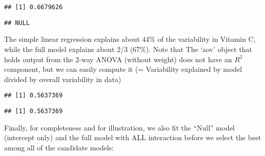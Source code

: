 \documentclass[
]{article}
\newenvironment{Shaded}{\begin{snugshade}}{\end{snugshade}}
\newcommand{\AttributeTok}[1]{\textcolor[rgb]{0.77,0.63,0.00}{#1}}
\newcommand{\CommentTok}[1]{\textcolor[rgb]{0.56,0.35,0.01}{\textit{#1}}}
\newcommand{\FunctionTok}[1]{\textcolor[rgb]{0.00,0.00,0.00}{#1}}
\newcommand{\NormalTok}[1]{#1}
\newcommand{\OtherTok}[1]{\textcolor[rgb]{0.56,0.35,0.01}{#1}}
\newcommand{\SpecialCharTok}[1]{\textcolor[rgb]{0.00,0.00,0.00}{#1}}
\begin{document}
\begin{verbatim}
## [1] 0.6679626
\end{verbatim}

\begin{Shaded}
\end{Shaded}

\begin{verbatim}
## NULL
\end{verbatim}

The simple linear regression explains about 44\% of the variability in
Vitamin C, while the full model explains about 2/3 (67\%). Note that The
`aov' object that holds output from the 2-way ANOVA (without weight)
does not have an \(R^{2}\) component, but we can easily compute it (=
Variability explained by model divided by overall variability in data)

\begin{Shaded}
\end{Shaded}

\begin{verbatim}
## [1] 0.5637369
\end{verbatim}

\begin{Shaded}
\end{Shaded}

\begin{verbatim}
## [1] 0.5637369
\end{verbatim}

Finally, for completeness and for illustration, we also fit the ``Null''
model (intercept only) and the full model with ALL interaction before we
select the best among all of the candidate models:
\end{document}
